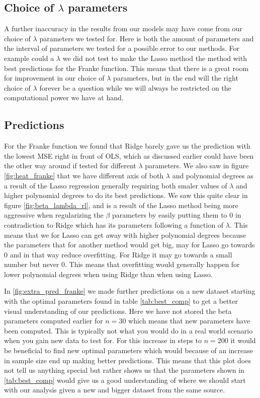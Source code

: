 \documentclass[12pt]{article}
\begin{document}
\subsection{Choice of $\lambda$ parameters}
A further inaccuracy in the results from our models may have come from our choice of $\lambda$ parameters we tested for. Here is both the amount of parameters and the interval of parameters we tested for a possible error to our methods. For example could a $\lambda$ we did not test to make the Lasso method the method with best predictions for the Franke function. This means that there is a great room for improvement in our choice of $\lambda$ parameters, but in the end will the right choice of $\lambda$ forever be a question while we will always be restricted on the computational power we have at hand.

\subsection{Predictions}
For the Franke function we found that Ridge barely gave us the prediction with the lowest MSE right in front of OLS, which as discussed earlier could have been the other way around if tested for different $\lambda$ parameters. We also saw in figure \ref{fig:heat_franke} that we have different axis of both $\lambda$ and polynomial degrees as a result of the Lasso regression generally requiring both smaler values of $\lambda$ and higher polynomial degrees to do its best predictions. We saw this quite clear in figure \ref{fig:beta_lambda_rl}, and is a result of the Lasso method being more aggressive when regularizing the $\beta$ parameters by easily putting them to 0 in contradiction to Ridge which has its parameters following a function of $\lambda$. This means that we for Lasso can get away with higher polynomial degrees because the parameters that for another method would get big, may for Lasso go towards 0 and in that way reduce overfitting. For Ridge it may go towards a small number but never 0. This means that overfitting would generally happen for lower polynomial degrees when using Ridge than when using Lasso.

In \ref{fig:extra_pred_franke} we made further predictions on a new dataset starting with the optimal parameters found in table \ref{tab:best_comp} to get a better visual understanding of our predictions. Here we have not stored the beta parameters computed earlier for $n=30$ which means that new parameters have been computed. This is typically not what you would do in a real world scenario when you gain new data to test for. For this increase in steps to $n=200$ it would be beneficial to find new optimal parameters which would because of an increase in sample size end up making better predictions. This means that this plot does not tell us anything special but rather shows us that the parameters shown in \ref{tab:best_comp} would give us a good understanding of where we should start with our analysis given a new and bigger dataset from the same source.
\end{document}
